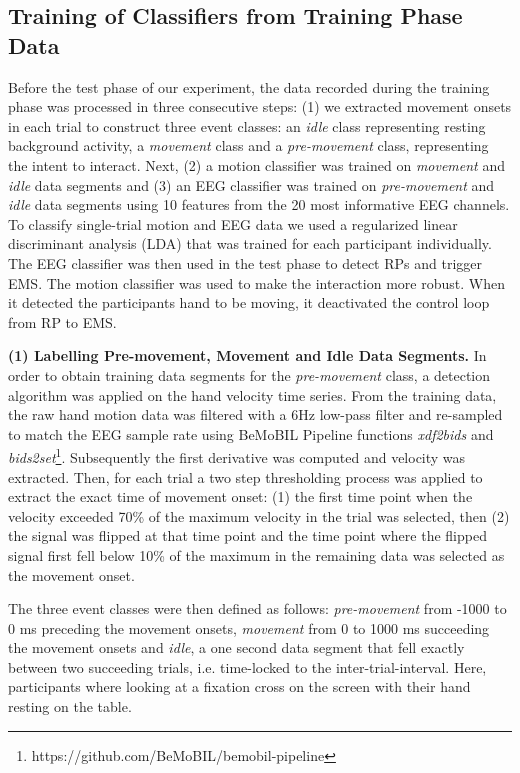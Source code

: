 \subsection{Training of Classifiers from Training Phase Data}

Before the test phase of our experiment, the data recorded during the training phase was processed in three consecutive steps: (1) we extracted movement onsets in each trial to construct three event classes: an \textit{idle} class representing resting background activity, a \textit{movement} class and a \textit{pre-movement} class, representing the intent to interact. Next, (2) a motion classifier was trained on \textit{movement} and \textit{idle} data segments and (3) an EEG classifier was trained on \textit{pre-movement} and \textit{idle} data segments using 10 features from the 20 most informative EEG channels. To classify single-trial motion and EEG data we used a regularized linear discriminant analysis (LDA) that was trained for each participant individually. The EEG classifier was then used in the test phase to detect RPs and trigger EMS. The motion classifier was used to make the interaction more robust. When it detected the participants hand to be moving, it deactivated the control loop from RP to EMS.


\indent\textbf{(1) Labelling Pre-movement, Movement and Idle Data Segments.}
In order to obtain training data segments for the \textit{pre-movement} class, a detection algorithm was applied on the hand velocity time series. From the training data, the raw hand motion data was filtered with a 6Hz low-pass filter and re-sampled to match the EEG sample rate using BeMoBIL Pipeline functions \textit{xdf2bids} and \textit{bids2set}\footnote{https://github.com/BeMoBIL/bemobil-pipeline}. Subsequently the first derivative was computed and velocity was extracted. Then, for each trial a two step thresholding process was applied to extract the exact time of movement onset: (1) the first time point when the velocity exceeded 70\% of the maximum velocity in the trial was selected, then (2) the signal was flipped at that time point and the time point where the flipped signal first fell below 10\% of the maximum in the remaining data was selected as the movement onset.

The three event classes were then defined as follows: \textit{pre-movement} from -1000 to 0 ms preceding the movement onsets, \textit{movement} from 0 to 1000 ms succeeding the movement onsets and \textit{idle}, a one second data segment that fell exactly between two succeeding trials, i.e. time-locked to the inter-trial-interval. Here, participants where looking at a fixation cross on the screen with their hand resting on the table.

